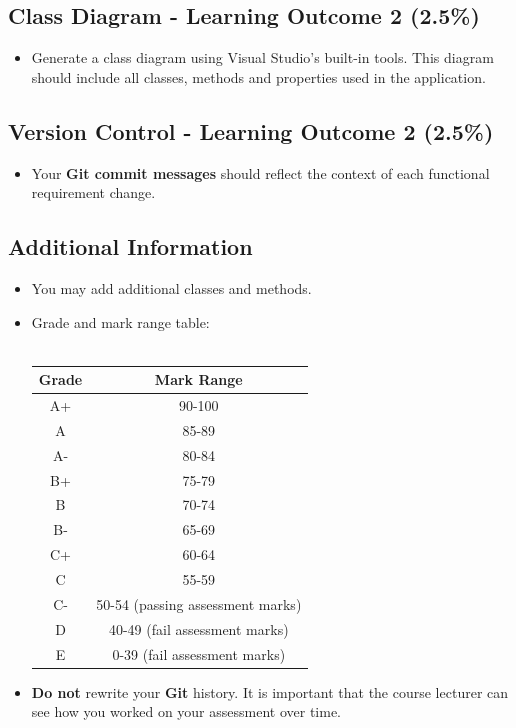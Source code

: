 \documentclass{article}
\begin{document}
\subsection*{Class Diagram - Learning Outcome 2 (2.5\%)}
\begin{itemize}
    \item Generate a class diagram using Visual Studio's built-in tools. This diagram should include all classes, methods and properties used in the application.
\end{itemize}

\subsection*{Version Control - Learning Outcome 2 (2.5\%)}
\begin{itemize}
    \item Your \textbf{Git commit messages} should reflect the context of each functional requirement change.
\end{itemize}

\subsection*{Additional Information}
\begin{itemize}
    \item You may add additional classes and methods. 
    \item Grade and mark range table:\\\\
    \renewcommand{\arraystretch}{1.5}
    \begin{tabular}{|c|c|}
        \hline
        \textbf{Grade} & \textbf{Mark Range} \\ \hline
        A+ & 90-100  \\ \hline
        A & 85-89  \\ \hline
        A- & 80-84 \\ \hline
        B+ & 75-79   \\ \hline
        B & 70-74  \\ \hline
        B- & 65-69  \\ \hline
        C+ & 60-64  \\ \hline
        C & 55-59 \\ \hline
        C- & 50-54 (passing assessment marks)  \\ \hline
        D & 40-49 (fail assessment marks)   \\ \hline
        E & 0-39 (fail assessment marks)   \\ \hline
    \end{tabular}
    \item \textbf{Do not} rewrite your \textbf{Git} history. It is important that the course lecturer can see how you worked on your assessment over time.
\end{itemize}
\end{document}
